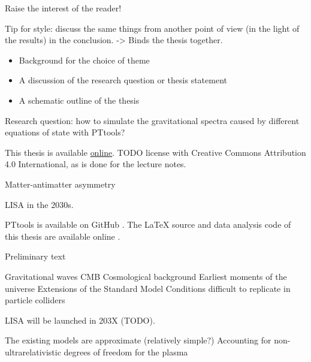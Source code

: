 Raise the interest of the reader!

Tip for style: discuss the same things from another point of view (in the light of the results) in the conclusion.
-> Binds the thesis together.

\begin{itemize}
    \item Background for the choice of theme
    \item A discussion of the research question or thesis statement
    \item A schematic outline of the thesis
\end{itemize}

Research question: how to simulate the gravitational spectra caused by different equations of state with PTtools?

This thesis is available \href{https://gitlab.com/AgenttiX/msc-thesis2}{online}.
TODO license with Creative Commons Attribution 4.0 International, as is done for the lecture notes.

Matter-antimatter asymmetry \cite{lecture_notes}

LISA in the 2030s.

PTtools is available on GitHub \cite{pttools}.
The LaTeX source and data analysis code of this thesis are available online \cite{thesis_source}.

Preliminary text

Gravitational waves
CMB
Cosmological background
Earliest moments of the universe
Extensions of the Standard Model
Conditions difficult to replicate in particle colliders

LISA will be launched in 203X (TODO).

The existing models are approximate (relatively simple?)
Accounting for non-ultrarelativistic degrees of freedom for the plasma
